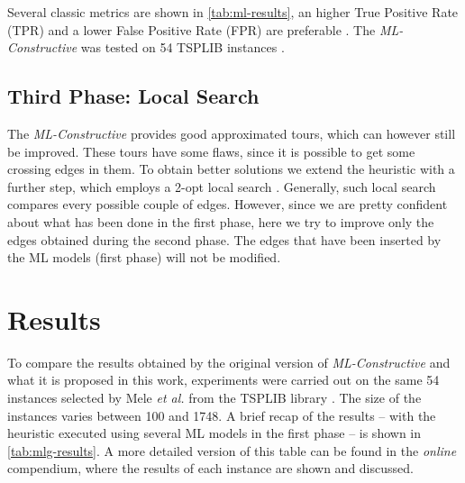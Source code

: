 \documentclass{article}
\begin{document}
\vspace{5 pt}

Several classic metrics are shown in \autoref{tab:ml-results}, an higher True Positive Rate (TPR) and a lower False Positive Rate (FPR) are preferable \cite{mele:gambardella:montemanni}.
The \emph{ML-Constructive} was tested on 54 TSPLIB instances \cite{reinelt}. 


\subsection{Third Phase: Local Search} \label{2opt}
The \emph{ML-Constructive} provides good approximated tours, which can however still be improved.
These tours have some flaws, since it is possible to get some crossing edges in them. 
To obtain better solutions we extend the heuristic with a further step, which employs a 2-opt local search \cite{local_search}.
Generally, such local search compares every possible couple of edges.
However, since we are pretty confident about what has been done in the first phase, here we try to improve only the edges obtained during the second phase.
The edges that have been inserted by the ML models (first phase)
will not be modified. 








\section{Results} \label{results}

To compare the results obtained by the original version of \textit{ML-Constructive} \cite{mele:gambardella:montemanni} and what it is proposed in this work, experiments were carried out on the same 54 instances selected by Mele \emph{et al.} 
\cite{mele:gambardella:montemanni} 
from the TSPLIB library \cite{reinelt}. 
The size of the instances varies between 100 and 1748. A brief recap of the results -- with the heuristic executed using several ML models in the first phase -- is shown in \autoref{tab:mlg-results}. 
A more detailed version of this table can be found in the \emph{online} compendium, where the results of each instance are shown and discussed.
\end{document}
